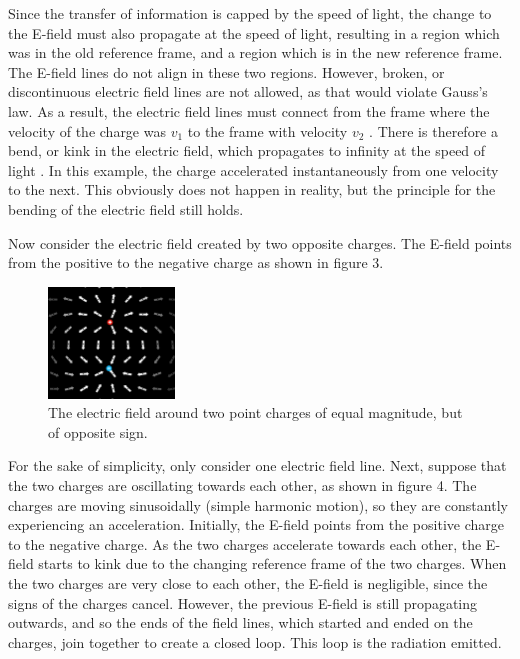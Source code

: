 \documentclass[12pt]{article}
\begin{document}
Since the transfer of information is capped by the speed of light, the change to the E-field must also propagate at the speed of light, resulting in a region which was in the old reference frame, and a region which is in the new reference frame. The E-field lines do not align in these two regions. However, broken, or discontinuous electric field lines are not allowed, as that would violate Gauss's law. As a result, the electric field lines must connect from the frame where the velocity of the charge was $v_1$ to the frame with velocity $v_2$ \cite{schroeder}. There is therefore a bend, or kink in the electric field, which propagates to infinity at the speed of light \cite{schroeder}. In this example, the charge accelerated instantaneously from one velocity to the next. This obviously does not happen in reality, but the principle for the bending of the electric field still holds.

Now consider the electric field created by two opposite charges. The E-field points from the positive to the negative charge as shown in figure 3. 
\newpage
\begin{figure}[h]
    \centering
    \includegraphics[width=0.3\textwidth]{positive-negative-EField.png}
    \caption{The electric field around two point charges of equal magnitude, but of opposite sign.}
\end{figure} 

For the sake of simplicity, only consider one electric field line. Next, suppose that the two charges are oscillating towards each other, as shown in figure 4. The charges are moving sinusoidally (simple harmonic motion), so they are constantly experiencing an acceleration. Initially, the E-field points from the positive charge to the negative charge. As the two charges accelerate towards each other, the E-field starts to kink due to the changing reference frame of the two charges. When the two charges are very close to each other, the E-field is negligible, since the signs of the charges cancel. However, the previous E-field is still propagating outwards, and so the ends of the field lines, which started and ended on the charges, join together to create a closed loop. This loop is the radiation emitted.
\end{document}
